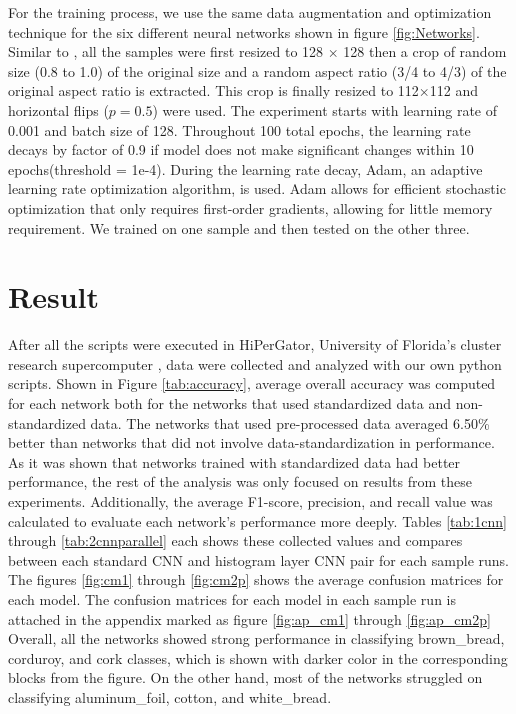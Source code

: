 \documentclass[10pt,twocolumn,letterpaper]{article}
\begin{document}
For the training process, we use the same data augmentation and optimization technique for the six different neural networks shown in figure \ref{fig:Networks}. Similar to \cite{Xue2018dep}, all the samples were first resized to 128 $\times$ 128 then a crop of random size (0.8 to 1.0) of the original size and a random aspect ratio (3/4 to 4/3) of the original aspect ratio is extracted. This crop is finally resized to 112$\times$112 and horizontal flips ($p=0.5$) were used. The experiment starts with learning rate of 0.001 and batch size of 128. Throughout 100 total epochs, the learning rate decays by factor of 0.9 if model does not make significant changes within 10 epochs(threshold = 1e-4). During the learning rate decay, Adam, an adaptive learning rate optimization algorithm, is used. Adam allows for efficient stochastic optimization that only requires first-order gradients, allowing for little memory requirement\cite{kingma2014adam}. We trained on one sample and then tested on the other three.


\section{Result}

After all the scripts were executed in HiPerGator, University of Florida's cluster research supercomputer \cite{hp}, data were collected and analyzed with our own python scripts. Shown in Figure \ref{tab:accuracy}, average overall accuracy was computed for each network both for the networks that used standardized data and non-standardized data. The networks that used pre-processed data averaged 6.50\% better than networks that did not involve data-standardization in performance.
As it was shown that networks trained with standardized data had better performance, the rest of the analysis was only focused on results from these experiments. Additionally, the average F1-score, precision, and recall value was calculated to evaluate each network's performance more deeply. Tables \ref{tab:1cnn} through \ref{tab:2cnnparallel} each shows these collected values and compares between each standard CNN and histogram layer CNN pair for each sample runs. The figures \ref{fig:cm1} through \ref{fig:cm2p} shows the average confusion matrices for each model. The confusion matrices for each model in each sample run is attached in the appendix marked as figure \ref{fig:ap_cm1} through \ref{fig:ap_cm2p} Overall, all the networks showed strong performance in classifying brown\_bread, corduroy, and cork classes, which is shown with darker color in the corresponding blocks from the figure. On the other hand, most of the networks struggled on classifying aluminum\_foil, cotton, and white\_bread.\\
\end{document}
